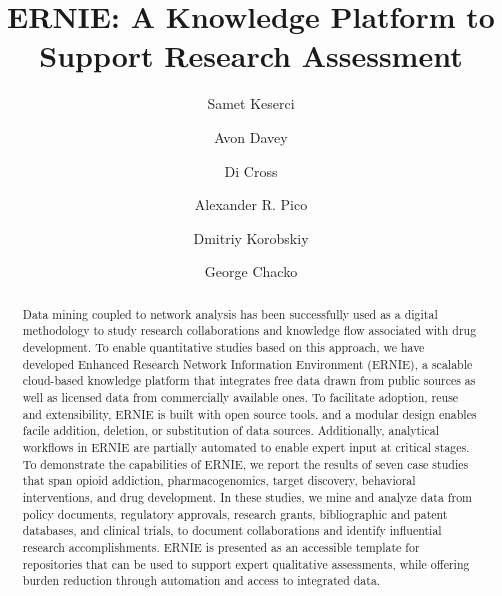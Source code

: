 \documentclass[review]{elsarticle}
\begin{document}
\begin{frontmatter}

\title{ERNIE: A Knowledge Platform to Support Research Assessment}

\author[nl]{Samet Keserci}
\author[nl]{Avon Davey}
\author[ca]{Di Cross}
\author[gi]{Alexander R. Pico}
\author[nl]{Dmitriy Korobskiy}
\author[nl]{George Chacko }



\address[nl]{NETE Labs, NET ESolutions Corporation, McLean, VA, USA}
\address[ca]{Research Data Science \& Evaluation, Clarivate Analytics, USA}
\address[gi]{Gladstone Institutes, San Francisco, CA, USA}

\raggedright

\begin{abstract}

Data mining coupled to network analysis has been successfully used as a digital methodology to study research collaborations and knowledge flow associated with drug development. To enable quantitative studies based on this approach, we have developed Enhanced Research Network Information Environment (ERNIE), a scalable cloud-based knowledge platform that integrates free data drawn from public sources as well as licensed data from commercially available ones. To facilitate adoption, reuse and extensibility, ERNIE is built with open source tools. and a modular design enables facile addition, deletion, or substitution of data sources. Additionally, analytical workflows in ERNIE are partially automated to enable expert input at critical stages. To demonstrate the capabilities of ERNIE, we report the results of seven case studies that span opioid addiction, pharmacogenomics, target discovery, behavioral interventions, and drug development. In these studies, we mine and analyze data from policy documents, regulatory approvals, research grants, bibliographic and patent databases, and clinical trials, to document collaborations and identify influential research accomplishments. ERNIE is presented as an accessible template for repositories that can be used to support expert qualitative assessments, while offering burden reduction through automation and access to integrated data.

\end{abstract}


\end{frontmatter}
\end{document}
